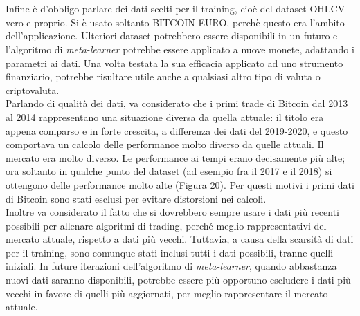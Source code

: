 \documentclass[a4paper,12pt]{report}
\begin{document}
\begin{fig}
\\~\\Infine è d'obbligo parlare dei dati scelti per il training, cioè del dataset OHLCV vero e proprio. Si è usato soltanto BITCOIN-EURO, perchè questo era l'ambito dell'applicazione. Ulteriori dataset potrebbero essere disponibili in un futuro e l'algoritmo di \textit{meta-learner} potrebbe essere applicato a nuove monete, adattando i parametri ai dati. Una volta testata la sua efficacia applicato ad uno strumento finanziario, potrebbe risultare utile anche a qualsiasi altro tipo di valuta o criptovaluta.\\ Parlando di qualità dei dati, va considerato che i primi trade di Bitcoin dal 2013 al 2014 rappresentano una situazione diversa da quella attuale: il titolo era appena comparso e in forte crescita, a differenza dei dati del 2019-2020, e questo comportava un calcolo delle performance molto diverso da quelle attuali. Il mercato era molto diverso. Le performance ai tempi erano decisamente più alte; ora soltanto in qualche punto del dataset (ad esempio fra il 2017 e il 2018) si ottengono delle performance molto alte (Figura 20). Per questi motivi i primi dati di Bitcoin sono stati esclusi per evitare distorsioni nei calcoli.\\ Inoltre va considerato il fatto che si dovrebbero sempre usare i dati più recenti possibili per allenare algoritmi di trading, perché meglio rappresentativi del mercato attuale, rispetto a dati più vecchi. Tuttavia, a causa della scarsità di dati per il training, sono comunque stati inclusi tutti i dati possibili, tranne quelli iniziali. In future iterazioni dell'algoritmo di \textit{meta-learner}, quando abbastanza nuovi dati saranno disponibili, potrebbe essere più opportuno escludere i dati più vecchi in favore di quelli più aggiornati, per meglio rappresentare il mercato attuale.

\end{fig}
\end{document}
